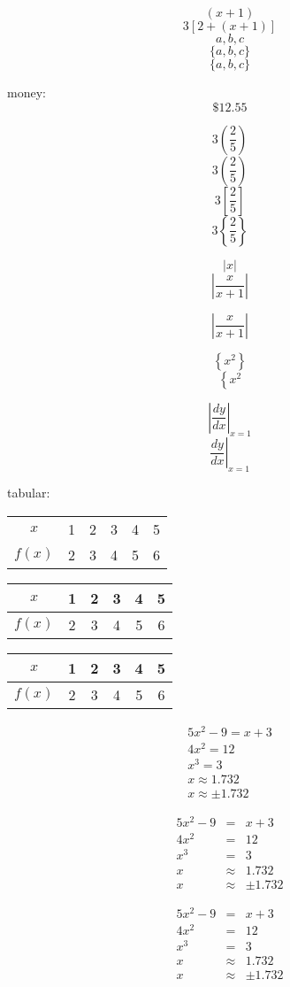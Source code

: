 \documentclass[10pt]{article}
\begin{document}
$$(x+1)$$
$$3[2+(x+1)]$$
$${a,b,c}$$
$$\{ a,b,c \}$$
$$\{a,b,c\}$$

money:
$$ \$ 12.55$$

$$ 3(\frac{2}{5})$$
$$ 3\left (\frac{2}{5} \right )$$
$$ 3\left [\frac{2}{5} \right ]$$
$$ 3\left \{\frac{2}{5} \right \}$$

$$|x|$$
$$|\frac{x}{x+1}  |$$

$$\left |\frac{x}{x+1} \right |$$

$$ \left \{x^2 \right \}$$
$$ \left \{x^2 \right.$$

$$ \left | \frac{dy}{dx} \right | _{x=1}$$
$$ \left . \frac{dy}{dx} \right | _{x=1}$$

tabular:
\begin{tabular}{cccccc}
$x$ & 1 & 2 & 3 & 4  & 5\\
$f(x)$ &2 &3 &4 &5 &6\\
\end{tabular}

\begin{tabular}{c|ccccc}
$x$ & 1 & 2 & 3 & 4  & 5\\ \hline
$f(x)$ &2 &3 &4 &5 &6\\
\end{tabular}

\begin{tabular}{|c|c|c|c|c|c|}
\hline 
$x$ & 1 & 2 & 3 & 4  & 5\\ \hline

$f(x)$ &2 &3 &4 &5 &6\\ \hline
\end{tabular}

\begin{eqnarray}
5x^2-9=x+3\\
4x^2=12\\
x^3=3\\
x\approx1.732\\
x\approx\pm1.732
\end{eqnarray}


\begin{eqnarray}
5x^2-9&=&x+3\\
4x^2&=&12\\
x^3&=&3\\
x&\approx&1.732\\
x&\approx&\pm1.732
\end{eqnarray}

\begin{eqnarray*}
5x^2-9&=&x+3\\
4x^2&=&12\\
x^3&=&3\\
x&\approx&1.732\\
x&\approx&\pm1.732
\end{eqnarray*}
\end{document}
